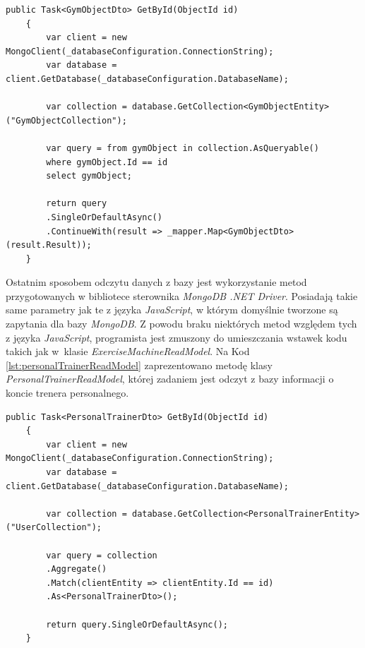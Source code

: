 \documentclass[a4paper,twoside,12pt]{book}
\begin{document}
\begin{lstlisting}[caption={Metoda odczytu danych z kolekcji \textit{GymObjectCollection} przy wykorzystaniu wstawek składni \textit{LINQ}}, label={lst:gymObjectReadModel}]
	public Task<GymObjectDto> GetById(ObjectId id)
	{
		var client = new MongoClient(_databaseConfiguration.ConnectionString);
		var database = client.GetDatabase(_databaseConfiguration.DatabaseName);
		
		var collection = database.GetCollection<GymObjectEntity>("GymObjectCollection");
		
		var query = from gymObject in collection.AsQueryable()
		where gymObject.Id == id
		select gymObject;
		
		return query
		.SingleOrDefaultAsync()
		.ContinueWith(result => _mapper.Map<GymObjectDto>(result.Result));
	}
\end{lstlisting}

Ostatnim sposobem odczytu danych z bazy jest wykorzystanie metod przygotowanych w bibliotece sterownika \textit{MongoDB .NET Driver}. Posiadają takie same parametry jak te z języka \textit{JavaScript}, w którym domyślnie tworzone są zapytania dla bazy \textit{MongoDB}. Z powodu braku niektórych metod względem tych z języka \textit{JavaScript}, programista jest zmuszony do umieszczania wstawek kodu takich jak w~klasie \textit{ExerciseMachineReadModel}. Na Kod \ref{lst:personalTrainerReadModel} zaprezentowano metodę klasy 
\textit{PersonalTrainerReadModel}, której zadaniem jest odczyt z bazy informacji o koncie trenera personalnego.
\begin{lstlisting}[caption={Metoda odczytu informacji o koncie trenera personalnego przy wykorzystaniu metod sterownika}, label={lst:personalTrainerReadModel}]
	public Task<PersonalTrainerDto> GetById(ObjectId id)
	{
		var client = new MongoClient(_databaseConfiguration.ConnectionString);
		var database = client.GetDatabase(_databaseConfiguration.DatabaseName);
		
		var collection = database.GetCollection<PersonalTrainerEntity>("UserCollection");
		
		var query = collection
		.Aggregate()
		.Match(clientEntity => clientEntity.Id == id)
		.As<PersonalTrainerDto>();
		
		return query.SingleOrDefaultAsync();
	}
\end{lstlisting}
\end{document}
